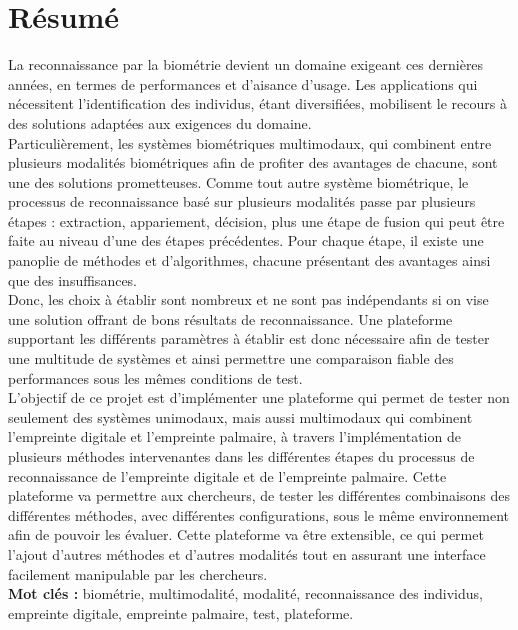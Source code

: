 \chapter*{Résumé}%
\label{Chapter2} %

\tab La reconnaissance par la biométrie devient un domaine exigeant ces dernières années, en termes de performances et d’aisance d’usage. Les applications qui nécessitent l’identification des individus, étant diversifiées, mobilisent le recours à des solutions adaptées aux exigences du domaine.\\
\tab Particulièrement, les systèmes biométriques multimodaux, qui combinent entre plusieurs modalités biométriques afin de profiter des avantages de chacune, sont une des solutions prometteuses. Comme tout autre système biométrique, le processus de reconnaissance basé sur plusieurs modalités passe par plusieurs étapes : extraction, appariement, décision, plus une étape de fusion qui peut être faite au niveau d’une des étapes précédentes. Pour chaque étape, il existe une panoplie de méthodes et d’algorithmes, chacune présentant des avantages ainsi que des insuffisances.
\\ \tab Donc, les choix à établir sont nombreux et ne sont pas indépendants si on vise une solution offrant de bons résultats de reconnaissance. Une plateforme supportant les différents paramètres à établir est donc nécessaire afin de tester une multitude de systèmes et ainsi permettre une comparaison fiable des performances sous les mêmes conditions de test. \\
\tab L’objectif de ce projet est d’implémenter une plateforme qui permet de tester non seulement des systèmes unimodaux, mais aussi multimodaux qui combinent l’empreinte digitale et l’empreinte palmaire, à travers l’implémentation de plusieurs méthodes intervenantes dans les différentes étapes du processus de reconnaissance de l’empreinte digitale et de l’empreinte palmaire. Cette plateforme va permettre aux chercheurs, de tester les différentes combinaisons des différentes méthodes, avec différentes configurations, sous le même environnement afin de pouvoir les évaluer. Cette plateforme va être extensible, ce qui permet l’ajout d’autres méthodes et d’autres modalités tout en assurant une interface facilement manipulable par les chercheurs. \\
\tab \textbf{Mot clés :} biométrie, multimodalité, modalité, reconnaissance des individus, empreinte digitale, empreinte palmaire, test, plateforme.


